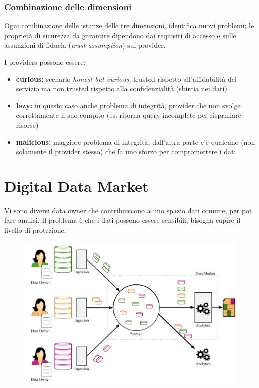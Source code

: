 \documentclass{report}
\begin{document}
\subsection{Combinazione delle dimensioni}
Ogni combinazione delle istanze delle tre dimensioni, identifica nuovi problemi; le proprietà di sicurezza da garantire
dipendono dai requisiti di accesso e sulle assunzioni di fiducia (\textit{trust assumption}) sui provider.

I providers possono essere:
\begin{itemize}
    \item \textbf{curious:} scenario \textit{honest-but-curious}, trusted rispetto all'affidabilità del servizio ma non trusted rispetto alla confidenzialità (sbircia nei dati)
    \item \textbf{lazy:} in questo caso anche problema di integrità, provider che non svolge correttamente il suo compito (es: ritorna query incomplete per risprmiare risorse)
    \item \textbf{malicious:} maggiore problema di integrità, dall'altra parte c'è qualcuno (non solamente il provider stesso) che fa uno sforzo per compromettere i dati
\end{itemize}

\chapter{Digital Data Market}
Vi sono diversi data owner che contribuiscono a uno spazio dati comune, per poi fare analisi.
Il problema è che i dati possono essere sensibili, bisogna capire il livello di protezione.
\begin{figure}[ht]
    \centering
    \includegraphics[width=1\linewidth]{images/digital data market.png}
\end{figure}
\end{document}
